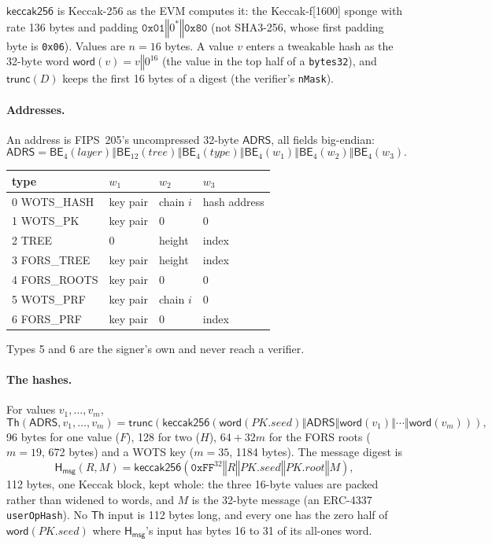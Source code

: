 \documentclass[11pt]{article}
\newcommand{\concat}{\mathbin\Vert}
\newcommand{\K}{\mathsf{keccak256}}
\newcommand{\Th}{\mathsf{Th}}
\newcommand{\Hmsg}{\mathsf{H_{msg}}}
\newcommand{\ADRS}{\mathsf{ADRS}}
\newcommand{\slot}{\mathsf{word}}
\newcommand{\trunc}{\mathsf{trunc}}
\newcommand{\BE}{\mathsf{BE}}
\newcommand{\seed}{\mathit{PK.seed}}
\newcommand{\pkroot}{\mathit{PK.root}}
\begin{document}
$\K$ is Keccak-256 as the EVM computes it: the Keccak-f[1600] sponge with rate 136
bytes and padding $\texttt{0x01}\concat 0^*\concat\texttt{0x80}$ (not SHA3-256, whose
first padding byte is \texttt{0x06}). Values are $n=16$ bytes. A value $v$ enters a tweakable hash as the 32-byte word $\slot(v)=v\concat 0^{16}$ (the value in the top half of a \texttt{bytes32}), and $\trunc(D)$ keeps the first 16 bytes of a digest (the verifier's \texttt{nMask}).

\paragraph{Addresses.}
An address is FIPS~205's uncompressed 32-byte $\ADRS$, all fields big-endian:
\[
  \ADRS=\BE_4(\mathit{layer})\concat\BE_{12}(\mathit{tree})\concat\BE_4(\mathit{type})
  \concat\BE_4(w_1)\concat\BE_4(w_2)\concat\BE_4(w_3).
\]
\begin{center}
\begin{tabular}{@{}llll@{}}
\toprule
type & $w_1$ & $w_2$ & $w_3$\\
\midrule
0 \textsf{WOTS\_HASH} & key pair & chain $i$ & hash address\\
1 \textsf{WOTS\_PK} & key pair & 0 & 0\\
2 \textsf{TREE} & 0 & height & index\\
3 \textsf{FORS\_TREE} & key pair & height & index\\
4 \textsf{FORS\_ROOTS} & key pair & 0 & 0\\
5 \textsf{WOTS\_PRF} & key pair & chain $i$ & 0\\
6 \textsf{FORS\_PRF} & key pair & 0 & index\\
\bottomrule
\end{tabular}
\end{center}
Types 5 and 6 are the signer's own and never reach a verifier.

\paragraph{The hashes.} For values $v_1,\dots,v_m$,
\[
  \Th(\ADRS, v_1,\dots,v_m)=\trunc\!\left(\K\!\left(\slot(\seed)\concat\ADRS\concat\slot(v_1)\concat\cdots\concat\slot(v_m)\right)\right),
\]
96 bytes for one value ($F$), 128 for two ($H$), $64+32m$ for the FORS roots
($m=19$, 672 bytes) and a WOTS key ($m=35$, 1184 bytes). The message digest is
\[
  \Hmsg(R,M)=\K\!\left(\texttt{0xFF}^{32}\concat R\concat\seed\concat\pkroot\concat M\right),
\]
112 bytes, one Keccak block, kept whole: the three 16-byte values are packed rather than widened to words, and $M$ is the 32-byte message (an ERC-4337 \texttt{userOpHash}). No $\Th$ input is 112 bytes long, and every one has the zero half of $\slot(\seed)$ where $\Hmsg$'s input has bytes 16 to 31 of its all-ones word.
\end{document}
